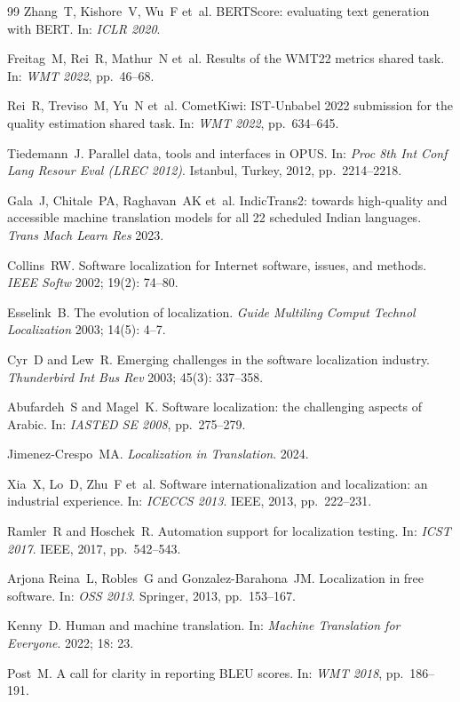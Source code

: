 \documentclass[Afour,sagev,times,doublespace]{sagej}
\begin{document}
\begin{thebibliography}{99}
Zhang~T, Kishore~V, Wu~F et~al.
\newblock BERTScore: evaluating text generation with BERT.
\newblock In: \emph{ICLR 2020}.

Freitag~M, Rei~R, Mathur~N et~al.
\newblock Results of the WMT22 metrics shared task.
\newblock In: \emph{WMT 2022}, pp.~46--68.

Rei~R, Treviso~M, Yu~N et~al.
\newblock CometKiwi: IST-Unbabel 2022 submission for the quality estimation shared task.
\newblock In: \emph{WMT 2022}, pp.~634--645.

Tiedemann~J.
\newblock Parallel data, tools and interfaces in OPUS.
\newblock In: \emph{Proc 8th Int Conf Lang Resour Eval (LREC 2012)}. Istanbul, Turkey, 2012, pp.~2214--2218.

Gala~J, Chitale~PA, Raghavan~AK et~al.
\newblock IndicTrans2: towards high-quality and accessible machine translation models for all 22 scheduled Indian languages.
\newblock \emph{Trans Mach Learn Res} 2023.

Collins~RW.
\newblock Software localization for Internet software, issues, and methods.
\newblock \emph{IEEE Softw} 2002; 19(2): 74--80.

Esselink~B.
\newblock The evolution of localization.
\newblock \emph{Guide Multiling Comput Technol Localization} 2003; 14(5): 4--7.

Cyr~D and Lew~R.
\newblock Emerging challenges in the software localization industry.
\newblock \emph{Thunderbird Int Bus Rev} 2003; 45(3): 337--358.

Abufardeh~S and Magel~K.
\newblock Software localization: the challenging aspects of Arabic.
\newblock In: \emph{IASTED SE 2008}, pp.~275--279.

Jimenez-Crespo~MA.
\newblock \emph{Localization in Translation}. 2024.

Xia~X, Lo~D, Zhu~F et~al.
\newblock Software internationalization and localization: an industrial experience.
\newblock In: \emph{ICECCS 2013}. IEEE, 2013, pp.~222--231.

Ramler~R and Hoschek~R.
\newblock Automation support for localization testing.
\newblock In: \emph{ICST 2017}. IEEE, 2017, pp.~542--543.

Arjona Reina~L, Robles~G and Gonzalez-Barahona~JM.
\newblock Localization in free software.
\newblock In: \emph{OSS 2013}. Springer, 2013, pp.~153--167.

Kenny~D.
\newblock Human and machine translation.
\newblock In: \emph{Machine Translation for Everyone}. 2022; 18: 23.

Post~M.
\newblock A call for clarity in reporting BLEU scores.
\newblock In: \emph{WMT 2018}, pp.~186--191.

\end{thebibliography}
\end{document}

